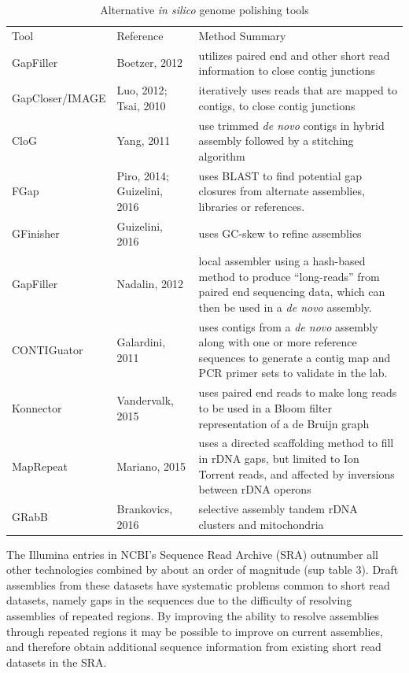 \documentclass[10pt]{article}
\makeatletter
\newcommand{\ra}[1]{\renewcommand{\arraystretch}{#1}}
\newcommand{\cmidrules}[1]{%
  \noalign{%
    \global\MD@cmidrules={}%
    \toks@={\cmidrule(l{.3\tabcolsep}r{.3\tabcolsep})}%
    \count@=\z@
    \loop\ifnum\count@<#1\relax
      \advance\count@\@ne
      \edef\MD@temp{\the\toks@{\the\count@-\the\count@}}%
      \global\MD@cmidrules\expandafter{\the\expandafter\MD@cmidrules\MD@temp}%
    \repeat
  }%
  \the\MD@cmidrules
}
\makeatother
\begin{document}
\begin{linenumbers}
\begin{table}[!h]
\centering
\ra{1.2}
\caption{Alternative \textit{\textit{in silico}} genome polishing tools}
\label{table:tools}
\begin{tabular}{lp{4cm}p{10cm}}
  \toprule
  Tool & Reference & Method Summary \\
  \cmidrules{3}
  GapFiller & Boetzer, 2012\cite{Boetzer2012} & utilizes paired end and other short read information to close contig junctions \\
  GapCloser/IMAGE & Luo, 2012\cite{Luo2012}; Tsai, 2010\cite{Tsai2010} & iteratively uses reads that are mapped to contigs, to close contig junctions \\
  CloG & Yang, 2011\cite{Yang2011} & use trimmed \textit{de novo} contigs in hybrid assembly followed by a stitching algorithm \\
  FGap & Piro, 2014\cite{Piro2014}; Guizelini, 2016\cite{Guizelini2016} & uses BLAST to find potential gap closures from alternate assemblies, libraries or references. \\
  GFinisher & Guizelini, 2016\cite{Guizelini2016} & uses GC-skew to refine assemblies \\
  GapFiller & Nadalin, 2012\cite{Nadalin2012} & local assembler using a hash-based method to produce ``long-reads'' from paired end sequencing data, which can then be used in a \textit{de novo} assembly. \\
  CONTIGuator & Galardini, 2011\cite{Galardini2011} & uses contigs from a \textit{de novo} assembly along with one or more reference sequences to generate a contig map and PCR primer sets to validate in the lab. \\
  Konnector & Vandervalk, 2015 \cite{Vandervalk2015} & uses paired end reads to make long reads to be used in a Bloom filter representation of a de Bruijn graph \\
  MapRepeat & Mariano, 2015\cite{Mariano2015} & uses a directed scaffolding method to fill in rDNA gaps, but limited to Ion Torrent reads, and affected by inversions between rDNA operons \cite{Mariano2016} \\
  GRabB & Brankovics, 2016\cite{Brankovics2016} & selective assembly tandem rDNA clusters and mitochondria\\
  \bottomrule
\end{tabular}
\end{table}



The Illumina entries in NCBI’s Sequence Read Archive (SRA) \cite{Kodama2012} outnumber all other technologies combined by about an order of magnitude (sup table 3). Draft assemblies from these datasets have systematic problems common to short read datasets, namely gaps in the sequences due to the difficulty of resolving assemblies of repeated regions\cite{Whiteford 2005, Treangen 2013}. By improving the ability to resolve assemblies through repeated regions  it may be possible to improve on current assemblies, and therefore obtain additional sequence information from existing short read datasets in the SRA.




\end{linenumbers}
\end{document}
